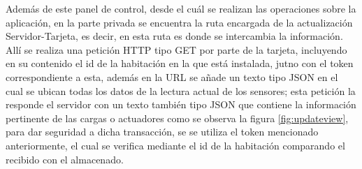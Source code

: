 \begin{frame}

Además de este panel de control, desde el cuál se realizan las operaciones sobre la aplicación, en la parte privada se encuentra la ruta encargada de la actualización Servidor-Tarjeta, es decir, en esta ruta es donde se intercambia la información. Allí se realiza una petición HTTP tipo GET por parte de la tarjeta, incluyendo en su contenido el id de la habitación en la que está instalada, jutno con el token correspondiente a esta, además en la URL se añade un texto tipo JSON en el cual se ubican todas los datos de la lectura actual de los sensores; esta petición la responde el servidor con un texto también tipo JSON que contiene la información pertinente de las cargas o actuadores como se observa la figura \ref{fig:updateview}, para dar seguridad a dicha transacción, se se utiliza el token mencionado anteriormente, el cual se verifica mediante el id de la habitación comparando el recibido con el almacenado.\\


\end{frame}

